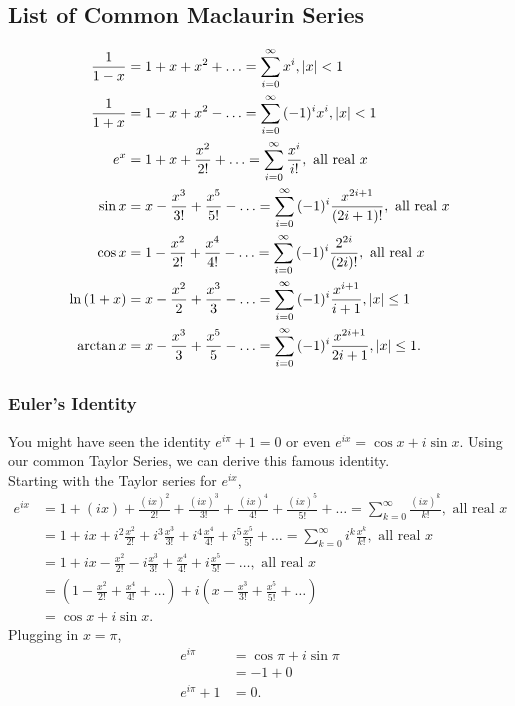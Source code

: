 \subsection{List of Common Maclaurin Series}
\begin{align*}
	\frac{1}{1-x} &= 1 + x + x^2 + \ldots = \sum_{i=0}^{\infty}{x^i}, \lvert x \rvert < 1 \\
	\frac{1}{1+x} &= 1 - x + x^2 - \ldots = \sum_{i=0}^{\infty}{(-1)^ix^i}, \lvert x \rvert < 1 \\
	e^x &= 1 + x + \frac{x^2}{2!} + \ldots = \sum_{i=0}^{\infty}{\frac{x^i}{i!}}, \text{ all real $x$} \\
	\sin{x} &= x - \frac{x^3}{3!} + \frac{x^5}{5!} - \ldots = \sum_{i=0}^{\infty}{(-1)^i\frac{x^{2i+1}}{(2i+1)!}}, \text{ all real $x$} \\
	\cos{x} &= 1 - \frac{x^2}{2!} + \frac{x^4}{4!} - \ldots = \sum_{i=0}^{\infty}{(-1)^i\frac{2^{2i}}{(2i)!}}, \text{ all real $x$} \\
	\ln{(1+x)} &= x - \frac{x^2}{2} + \frac{x^3}{3} - \ldots = \sum_{i=0}^{\infty}{(-1)^i\frac{x^{i+1}}{i+1}}, \lvert x \rvert \leq 1 \\
	\arctan{x} &= x - \frac{x^3}{3} + \frac{x^5}{5} - \ldots = \sum_{i=0}^{\infty}{(-1)^i\frac{x^{2i+1}}{2i+1}}, \lvert x \rvert \leq 1.
\end{align*}

\subsubsection{Euler's Identity}
You might have seen the identity $e^{i\pi} + 1 = 0$ or even $e^{ix} = \cos{x} + i\sin{x}$.
Using our common Taylor Series, we can derive this famous identity. \\

\noindent
Starting with the Taylor series for $e^{ix}$,
\begin{align*}
	e^{ix} &= 1 + (ix) + \frac{(ix)^2}{2!} + \frac{(ix)^3}{3!} + \frac{(ix)^4}{4!} + \frac{(ix)^5}{5!} + \ldots = \sum_{k=0}^{\infty}{\frac{(ix)^k}{k!}}, \text{ all real $x$} \\
	&= 1 + ix + i^2\frac{x^2}{2!} + i^3\frac{x^3}{3!} + i^4\frac{x^4}{4!} + i^5\frac{x^5}{5!} + \ldots = \sum_{k=0}^{\infty}{i^k\frac{x^k}{k!}}, \text{ all real $x$} \\
	&= 1 + ix - \frac{x^2}{2!} - i\frac{x^3}{3!} + \frac{x^4}{4!} + i\frac{x^5}{5!} - \ldots, \text{ all real $x$} \\
	&= \left(1 - \frac{x^2}{2!} + \frac{x^4}{4!} + \ldots \right) + i\left(x - \frac{x^3}{3!} + \frac{x^5}{5!} + \ldots \right) \\
	&= \cos{x} + i\sin{x}.
\end{align*}
\noindent
Plugging in $x=\pi$,
\begin{align*}
	e^{i\pi} &= \cos{\pi} + i\sin{\pi} \\
	&= -1 + 0 \\
	e^{i\pi} + 1 &= 0.
\end{align*}
